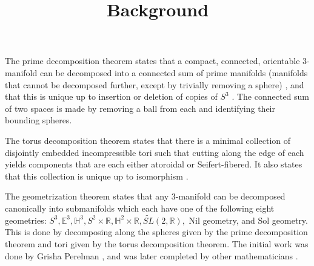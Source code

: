 \documentclass[12pt]{amsart}
\newcommand{\ignore}[1]{}
\begin{document}
\title{Background}
\maketitle

\ignore{1.  Describe 3-manifold decompositions.
  A.  Prime decomposition theorem -- see Allen Hatcher's notes for statement and references.

}
\ignore{@Misc{•,
OPTkey = {•},
OPTauthor = {Allen Hatcher},
OPTtitle = {Notes on Basic 3-Manifold Topology},
OPThowpublished = {•},
OPTmonth = {•},
OPTyear = {•},
OPTnote = {•},
OPTannote = {•}
}}

The prime decomposition theorem states that a compact, connected, orientable 3-manifold can be decomposed into a connected sum of prime manifolds (manifolds that cannot be decomposed further, except by trivially removing a sphere) \cite{Kneser}, and that this is unique up to insertion or deletion of copies of $S^3$ \cite{Milnor}. The connected sum of two spaces is made by removing a ball from each and identifying their bounding spheres.
  

The torus decomposition theorem states that there is a minimal collection of disjointly embedded incompressible tori such that cutting along the edge of each yields components that are each either atoroidal or Seifert-fibered. It also states that this collection is unique up to isomorphism \cite{JSJ3} \cite{JSJ2} \cite{JSJ1} \cite{JSJ4}.



The geometrization theorem states that any 3-manifold can be decomposed canonically into submanifolds which each have one of the following eight geometries: $S^3, \mathbb{E}^3, \mathbb{H}^3, S^2 \times \mathbb{R}, \mathbb{H}^2 \times \mathbb{R}, \tilde{SL}(2,\mathbb{R}),$ Nil geometry, and Sol geometry. This is done by decomposing along the spheres given by the prime decomposition theorem and tori given by the torus decomposition theorem. The initial work was done by Grisha Perelman \cite{Perelman1} \cite{Perelman3} \cite{Perelman2}, and was later completed by other mathematicians \cite{Geometrization1} \cite{Geometrization2} \cite{Geometrization3}.
\end{document}
